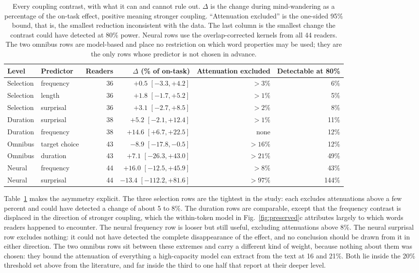 \documentclass[11pt]{article}
\begin{document}
\begin{table}[t]
\centering
\small
\caption{Every coupling contrast, with what it can and cannot rule out. $\Delta$ is the change
during mind-wandering as a percentage of the on-task effect, positive meaning stronger coupling.
``Attenuation excluded'' is the one-sided 95\% bound, that is, the smallest reduction
inconsistent with the data. The last column is the smallest change the contrast could have
detected at 80\% power. Neural rows use the overlap-corrected kernels from all 44 readers. The
two omnibus rows are model-based and place no restriction on which word properties may be used;
they are the only rows whose predictor is not chosen in advance.}
\label{tab:equiv}
\begin{tabular}{llrrrr}
\toprule
Level & Predictor & Readers & $\Delta$ (\% of on-task) & Attenuation excluded & Detectable at 80\% \\
\midrule
Selection & frequency  & 36 & $+0.5$ $[-3.3, +4.2]$     & $>3\%$  & 6\% \\
Selection & length     & 36 & $+1.8$ $[-1.7, +5.2]$     & $>1\%$  & 5\% \\
Selection & surprisal  & 36 & $+3.1$ $[-2.7, +8.5]$     & $>2\%$  & 8\% \\
Duration  & surprisal  & 38 & $+5.2$ $[-2.1, +12.4]$    & $>1\%$  & 11\% \\
Duration  & frequency  & 38 & $+14.6$ $[+6.7, +22.5]$   & none    & 12\% \\
Omnibus   & target choice & 43 & $-8.9$ $[-17.8, -0.5]$ & $>16\%$ & 12\% \\
Omnibus   & duration      & 43 & $+7.1$ $[-26.3, +43.0]$ & $>21\%$ & 49\% \\
Neural    & frequency  & 44 & $+16.0$ $[-12.5, +45.9]$  & $>8\%$  & 43\% \\
Neural    & surprisal  & 44 & $-13.4$ $[-112.2, +81.6]$ & $>97\%$ & 144\% \\
\bottomrule
\end{tabular}
\end{table}

Table~\ref{tab:equiv} makes the asymmetry explicit. The three selection rows are the tightest
in the study: each excludes attenuations above a few percent and could have detected a change of
about 5 to 8\%. The duration rows are comparable, except that the frequency contrast is displaced
in the direction of stronger coupling, which the within-token model in
Fig.~\ref{fig:preserved}c attributes largely to which words readers happened to encounter. The
neural frequency row is looser but still useful, excluding attenuations above 8\%. The neural
surprisal row excludes nothing: it could not have detected the complete disappearance of the
effect, and no conclusion should be drawn from it in either direction. The two omnibus rows sit between these
extremes and carry a different kind of weight, because nothing about them was chosen: they bound
the attenuation of everything a high-capacity model can extract from the text at 16 and 21\%.
Both lie inside the 20\% threshold set above from the literature, and far inside the third to one
half that \citet{schad2012} report at their deeper level.
\end{document}
